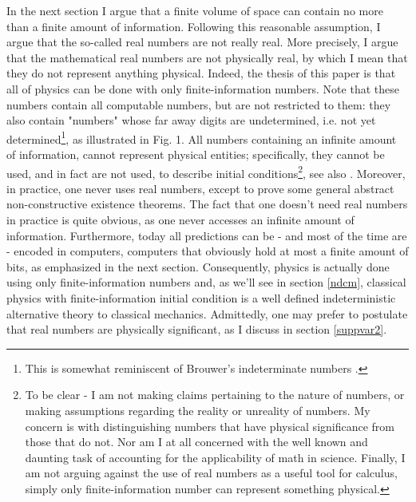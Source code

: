 \documentclass[pra,aps,groupedaddress,twocolumn,floatfix,nofootinbib]{revtex4}
\begin{document}
In the next section I argue that a finite volume of space can contain no more than a finite amount of information. Following this reasonable assumption, I argue that the so-called real numbers are not really real. More precisely, I argue that the mathematical real numbers are not physically real, by which I mean that they do not represent anything physical. Indeed, the thesis of this paper is that all of physics can be done with only finite-information numbers. Note that these numbers contain all computable numbers, but are not restricted to them: they also contain "numbers" whose far away digits are undetermined, i.e. not yet determined\footnote{This is somewhat reminiscent of Brouwer's indeterminate numbers \cite{IndeterminateNumbersPosy}.}, as illustrated in Fig. 1. All numbers containing an infinite amount of information, cannot represent physical entities; specifically, they cannot be used, and in fact are not used, to describe initial conditions\footnote{To be clear  - I am not making claims pertaining to the nature of numbers, or making assumptions regarding the reality or unreality of numbers. My concern is with distinguishing numbers that have physical significance from those that do not. Nor am I at all concerned with the well known and daunting task of accounting for the applicability of math in science. Finally, I am not arguing against the use of real numbers as a useful tool for calculus, simply only finite-information number can represent something physical.}, see also \cite{DowekRealNb13}. Moreover, in practice, one never uses real numbers, except to prove some general abstract non-constructive existence theorems. The fact that one doesn't need real numbers in practice is quite obvious, as one never accesses an infinite amount of information. Furthermore, today all predictions can be - and most of the time are - encoded in computers, computers that obviously hold at most a finite amount of bits, as emphasized in the next section. Consequently, physics is actually done using only finite-information numbers and, as we'll see in section \ref{ndcm}, classical physics with finite-information initial condition is a well defined indeterministic alternative theory to classical mechanics. Admittedly, one may prefer to postulate that real numbers are physically significant, as I discuss in section \ref{suppvar2}.
\end{document}
